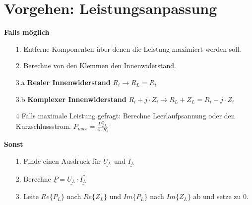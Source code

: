 \section{Vorgehen: Leistungsanpassung}

\textbf{Falls möglich} \\
\begin{itemize}
  \item [1. ] Entferne Komponenten über denen die Leistung maximiert werden soll.
  \item [2. ] Berechne von den Klemmen den Innenwiderstand.
  \item [3.a] \textbf{Realer Innenwiderstand} $R_i \rightarrow R_L = R_i$
  \item [3.b] \textbf{Komplexer Innenwiderstand} $R_i + j \cdot Z_i  \rightarrow R_L + Z_L = R_i - j \cdot Z_i$
  \item [4] Falls maximale Leistung gefragt: Berechne Leerlaufpsannung oder den Kurzschlussstrom. $P_{max} = \frac{U_{LL}^2}{4\cdot R_i}$
\end{itemize}
\textbf{Sonst} \\

\begin{itemize}
  \item [1. ] Finde einen Ausdruck für $\underline{U_L}$ und $\underline{I_L}$
  \item [2. ] Berechne $\underline{P} =\underline{U_L}\cdot\underline{I_L^*}$
  \item [3. ] Leite $Re\{P_L\}$ nach $Re\{Z_L\}$ und $Im\{P_L\}$ nach $Im\{Z_L\}$ ab und setze zu 0.
\end{itemize}
